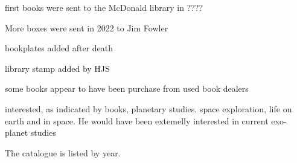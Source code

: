 first books were sent to the McDonald library in ????

More boxes were sent in 2022 to Jim Fowler

bookplates added after death

library stamp added by HJS

some books appear to have been purchase from used book dealers

interested, as indicated by books, planetary studies. space
exploration, life on earth and in space. He would have been extemelly
interested in current exo-planet studies

The catalogue is listed by year.
